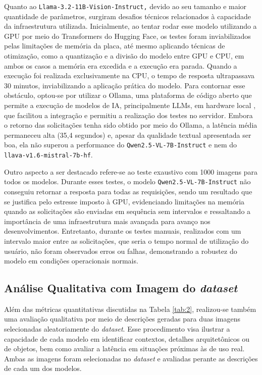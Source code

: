 Quanto ao \lstinline{Llama-3.2-11B-Vision-Instruct,} devido ao seu tamanho e maior quantidade de parâmetros, surgiram desafios técnicos relacionados à capacidade da infraestrutura utilizada. Inicialmente, ao tentar rodar esse modelo utilizando a GPU por meio do Transformers do Hugging Face, os testes foram inviabilizados pelas limitações de memória da placa, até mesmo aplicando técnicas de otimização, como a quantização e a divisão do modelo entre GPU e CPU, em ambos os casos a memória era excedida e a execução era parada. Quando a execução foi realizada exclusivamente na CPU, o tempo de resposta ultrapassava 30 minutos, inviabilizando a aplicação prática do modelo. Para contornar esse obstáculo, optou-se por utilizar o Ollama, uma plataforma de código aberto que permite a execução de modelos de IA, principalmente LLMs, em hardware local \cite{bem2024}, que facilitou a integração e permitiu a realização dos testes no servidor. Embora o retorno das solicitações tenha sido obtido por meio do Ollama, a latência média permaneceu alta (35,4 segundos) e, apesar da qualidade textual apresentada ser boa, ela não superou a performance do \lstinline{Qwen2.5-VL-7B-Instruct} e nem do \lstinline{llava-v1.6-mistral-7b-hf}.

Outro aspecto a ser destacado refere-se ao teste exaustivo com 1000 imagens para todos os modelos. Durante esses testes, o modelo \lstinline{Qwen2.5-VL-7B-Instruct} não conseguiu retornar a resposta para todas as requisições, sendo um resultado que se justifica pelo estresse imposto à GPU, evidenciando limitações na memória quando as solicitações são enviadas em sequência sem intervalos e ressaltando a importância de uma infraestrutura mais avançada para avanço nos desenvolvimentos. Entretanto, durante os testes manuais, realizados com um intervalo maior entre as solicitações, que seria o tempo normal de utilização do usuário, não foram observados erros ou falhas, demonstrando a robustez do modelo em condições operacionais normais.

\subsection{Análise Qualitativa com Imagem do \textit{dataset}}

Além das métricas quantitativas discutidas na Tabela \ref{tab:2}, realizou-se também uma avaliação qualitativa por meio de descrições geradas para duas imagens selecionadas aleatoriamente do \textit{dataset}. Esse procedimento visa ilustrar a capacidade de cada modelo em identificar contextos, detalhes arquitetônicos ou de objetos, bem como avaliar a latência em situações próximas às de uso real. Ambas as imagens foram selecionadas no \textit{dataset} e avaliadas perante as descrições de cada um dos modelos.

